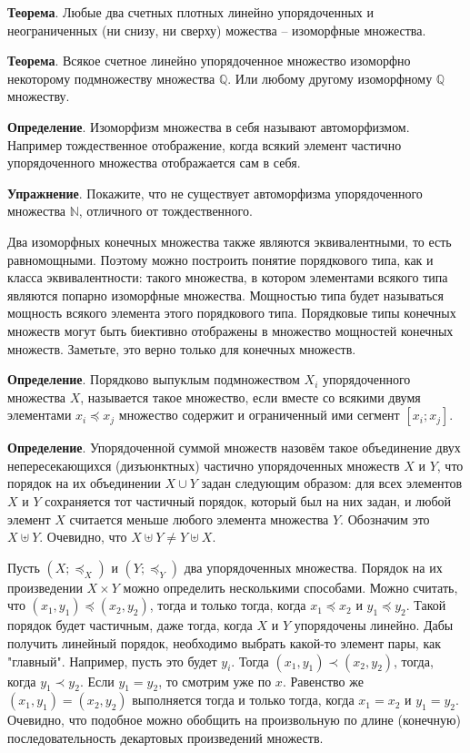 \documentclass[a4paper]{book}
\begin{document}
\textbf{Теорема}. Любые два счетных плотных линейно упорядоченных и неограниченных (ни снизу, ни сверху) можества -- изоморфные множества. 


\textbf{Теорема}. Всякое счетное линейно упорядоченное множество изоморфно некоторому подмножеству множества $\mathbb{Q}$. Или любому другому изоморфному $\mathbb{Q}$ множеству. 


\textbf{Определение}. Изоморфизм множества в себя называют автоморфизмом. Например тождественное отображение, когда всякий элемент частично упорядоченного множества отображается сам в себя.


\textbf{Упражнение}. Покажите, что не существует автоморфизма упорядоченного множества $\mathbb{N}$, отличного от тождественного. 

 

Два изоморфных конечных множества также являются эквивалентными, то есть равномощными. Поэтому можно построить понятие порядкового типа, как и класса эквивалентности: такого множества, в котором элементами всякого типа являются попарно изоморфные множества.  Мощностью типа будет называться мощность всякого элемента этого порядкового типа. Порядковые типы конечных множеств могут быть биективно отображены в множество мощностей конечных множеств. Заметьте, это верно только для конечных множеств. 

\textbf{Определение}. Порядково выпуклым подмножеством $X_i$ упорядоченного множества $X$, называется такое множество, если вместе со всякими двумя элементами $x_i\preceq x_j$ множество содержит и ограниченный ими сегмент $[x_i;x_j]$. 

\textbf{Определение}. Упорядоченной суммой множеств назовём такое объединение двух непересекающихся (дизъюнктных) частично упорядоченных множеств $X$ и $Y$, что порядок на их объединении $X\cup Y$ задан следующим образом: для всех элементов $X$ и $Y$ сохраняется тот частичный порядок, который был на них задан, и любой элемент $X$ считается меньше любого элемента множества $Y$. Обозначим это $X\uplus Y$. Очевидно, что $X\uplus Y \neq Y\uplus X$. 

Пусть $(X;\preceq_{X})$ и $(Y;\preceq_{Y})$ два упорядоченных множества. Порядок на их произведении $X\times Y$ можно определить несколькими способами. Можно считать, что $(x_1,y_1)\preceq(x_2,y_2)$, тогда и только тогда, когда $x_1\preceq x_2$ и $y_1\preceq y_2$. Такой порядок будет частичным, даже тогда, когда $X$ и $Y$ упорядочены линейно. Дабы получить линейный порядок, необходимо выбрать какой-то элемент пары, как "главный". Например, пусть это будет $y_i$. Тогда $(x_1,y_1)\prec (x_2,y_2)$, тогда, когда $y_1\prec y_2$. Если $y_1 = y_2$, то смотрим уже по $x$. Равенство же $(x_1,y_1) = (x_2,y_2)$ выполняется тогда и только тогда, когда $x_1 = x_2$ и $y_1 = y_2$. Очевидно, что подобное можно обобщить на произвольную по длине (конечную) последовательность декартовых произведений множеств. 
\end{document}

